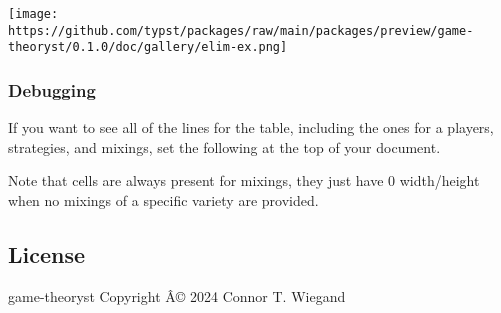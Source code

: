 \begin{Shaded}
\begin{Highlighting}[]
\NormalTok{)}

\NormalTok{  [$6,4$], [$7,3$], [$5,5$], [$6,6$],}
\NormalTok{  [$7,3$], [$2,7$], [$4,6$], [$5,5$],}
\NormalTok{  [$8,2$], [$6,4$], [$3,7$], [$2,8$],}
\NormalTok{  [$3,7$], [$5,5$], [$4,6$], [$5,5$],}
\NormalTok{)}
\end{Highlighting}
\end{Shaded}

\texttt{[image: https://github.com/typst/packages/raw/main/packages/preview/game-theoryst/0.1.0/doc/gallery/elim-ex.png]}

\subsubsection{Debugging}\label{debugging}

If you want to see all of the lines for the table, including the ones
for a players, strategies, and mixings, set the following at the top of
your document.

\begin{Shaded}
\begin{Highlighting}[]
\end{Highlighting}
\end{Shaded}

Note that cells are always present for mixings, they just have 0
width/height when no mixings of a specific variety are provided.

\subsection{License}\label{license}

game-theoryst Copyright Â© 2024 Connor T. Wiegand

